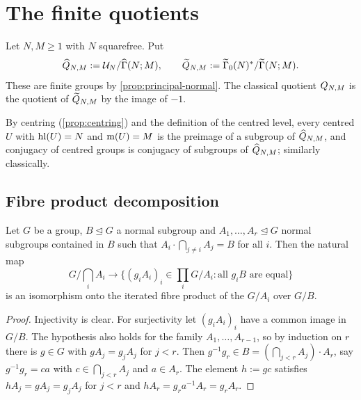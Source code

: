 \section{The finite quotients}\label{sec:quotients}

\begin{definition}\label{def:finite-quotients}
Let $N, M \geq 1$ with $N$ squarefree. Put
\[
  \AdelicQuotientGroup{N}{M} := \MaxCompact{N}/\GammaPrincipal[ad]{N}{M},
  \qquad
  \LiftedQuotientGroup{N}{M} := \GammaZeroStar[lift]{N}/\GammaPrincipal[lift]{N}{M}.
\]
These are finite groups by \cref{prop:principal-normal}. The classical
quotient $Q_{N,M}$ is the quotient of $\widetilde{Q}_{N,M}$
by the image of $-1$.
\end{definition}

By centring (\cref{prop:centring}) and the definition of the centred level,
every centred $U$ with $\operatorname{hl}(U) = N$ and
$\operatorname{m}(U) = M$ is the preimage of a subgroup of
$\widehat{Q}_{N,M}$, and conjugacy of centred groups is conjugacy
of subgroups of $\widehat{Q}_{N,M}$; similarly classically.

\subsection{Fibre product decomposition}

\begin{lemma}\label{lem:goursat}
Let $G$ be a group, $B \trianglelefteq G$ a normal subgroup and
$A_1, \ldots, A_r \trianglelefteq G$ normal subgroups contained in $B$ such
that $A_i\cdot\bigcap_{j \neq i}A_j = B$ for all $i$. Then the natural map
\[
  G/\textstyle\bigcap_{i}A_i \longrightarrow
  \{(g_iA_i)_i \in \prod_i G/A_i : \text{all } g_iB \text{ are equal}\}
\]
is an isomorphism onto the iterated fibre product of the $G/A_i$ over
$G/B$.
\end{lemma}

\begin{proof}
Injectivity is clear. For surjectivity let $(g_iA_i)_i$ have a common
image in $G/B$. The hypothesis also holds for the family
$A_1, \ldots, A_{r-1}$, so by induction on $r$ there is $g \in G$ with
$gA_j = g_jA_j$ for $j < r$. Then $g^{-1}g_r \in B =
(\bigcap_{j<r}A_j)\cdot A_r$, say $g^{-1}g_r = ca$ with
$c \in \bigcap_{j<r}A_j$ and $a \in A_r$. The element $h := gc$ satisfies
$hA_j = gA_j = g_jA_j$ for $j < r$ and $hA_r = g_ra^{-1}A_r = g_rA_r$.
\end{proof}

